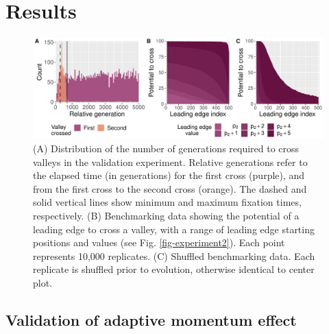 \section{Results}

\begin{figure}[h!]
\begin{center}
\includegraphics[width=\textwidth]{05_adaptive_momentum/media/combined_plots_full_split.pdf}
\caption{
    (A)
    Distribution of the number of generations required to cross valleys in the validation experiment. 
    Relative generations refer to the elapsed time (in generations) for the first cross (purple), and from the first cross to the second cross (orange). 
    The dashed and solid vertical lines show minimum and maximum fixation times, respectively. 
    (B) 
    Benchmarking data showing the potential of a leading edge to cross a valley, with a range of leading edge starting positions and values (see Fig. \ref{fig-experiment2}). 
    Each point represents 10,000 replicates.
    (C)
    Shuffled benchmarking data. Each replicate is shuffled prior to evolution, otherwise identical to center plot.
}
\label{fig-combined-plots}
\end{center}
\end{figure}

\subsection{Validation of adaptive momentum effect}

